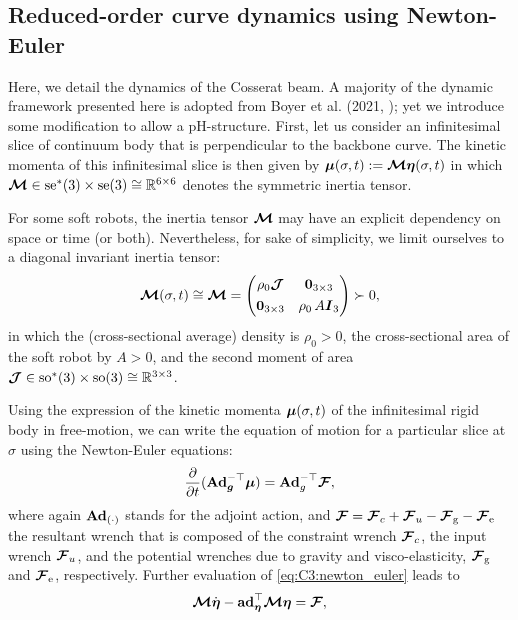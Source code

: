 \subsection{Reduced-order curve dynamics using Newton-Euler}
Here, we detail the dynamics of the Cosserat beam. A majority of the dynamic framework presented here is adopted from Boyer et al. (2021, \cite{Boyer2021}); yet we introduce some modification to allow a pH-structure. First, let us consider an infinitesimal slice of continuum body that is perpendicular to the backbone curve. The kinetic momenta of this infinitesimal slice is then given by $\boldsymbol{\mu}(\sigma,t) := {\boldsymbol{\mathcal{M}}} \boldsymbol{\eta}(\sigma,t)$ in which ${\boldsymbol{\mathcal{M}}} \in \textup{\textrm{se}}^*(3) \times \textup{\textrm{se}}(3) \cong \mathbb{R}^{6\times 6}$ denotes the symmetric inertia tensor.
%
\begin{rmk}
For some soft robots, the inertia tensor ${\boldsymbol{\mathcal{M}}}$ may have an explicit dependency on space or time (or both). Nevertheless, for sake of simplicity, we limit ourselves to a diagonal invariant inertia tensor:
%
\begin{equation*}
{\boldsymbol{\mathcal{M}}}(\sigma,t) \cong {\boldsymbol{\mathcal{M}}} = \begin{pmatrix} \rho_0 \boldsymbol{\mathcal{J}}  & \boldsymbol{0}_{3\times3}  \\[0.35em]
  \boldsymbol{0}_{3\times3} & \rho_0\, A\boldsymbol{I}_3 \end{pmatrix} \succ 0,
\end{equation*}
%
in which the (cross-sectional average) density is $\rho_0 > 0$, the cross-sectional area of the soft robot by $A>0$, and the second moment of area $\boldsymbol{\mathcal{J}} \in \textup{\textrm{so}}^*(3) \times \textup{\textrm{so}}(3) \cong \mathbb{R}^{3\times 3}$.
\end{rmk}
%
\noindent Using the expression of the kinetic momenta $\boldsymbol{\mu}(\sigma,t)$ of the infinitesimal rigid body in free-motion, we can write the equation of motion for a particular slice at $\sigma$ using the Newton-Euler equations:
%
\begin{equation}
\frac{\partial }{\partial t} (\textbf{Ad}_{{\boldsymbol{g}}}^{-\top} \boldsymbol{\mu}) = \textbf{Ad}_{g}^{-\top}\boldsymbol{\mathcal{F}},\label{eq:C3:newton_euler}
\end{equation}
%
where again $\textbf{Ad}_{(\cdot)}$ stands for the adjoint action, and $\boldsymbol{\mathcal{F}} = \boldsymbol{\mathcal{F}}_c  + \boldsymbol{\mathcal{F}}_u - \boldsymbol{\mathcal{F}}_{\scriptstyle\textrm{g}} - \boldsymbol{\mathcal{F}}_{\scriptstyle\textrm{e}}$ the resultant wrench that is composed of the constraint wrench $\boldsymbol{\mathcal{F}}_c$, the input wrench $\boldsymbol{\mathcal{F}}_u$, and the potential wrenches due to gravity and visco-elasticity, $\boldsymbol{\mathcal{F}}_{\scriptstyle\textrm{g}}$ and $\boldsymbol{\mathcal{F}}_{\scriptstyle\textrm{e}}$, respectively. Further evaluation of \eqref{eq:C3:newton_euler} leads to
%
\begin{equation}
{\boldsymbol{\mathcal{M}}}\dot{\boldsymbol{\eta}} - \textbf{ad}_{\boldsymbol{\eta}}^\top {\boldsymbol{\mathcal{M}}} \boldsymbol{\eta} = \boldsymbol{\mathcal{F}},
\label{eq:C3:newton-euler-2}
\end{equation}
